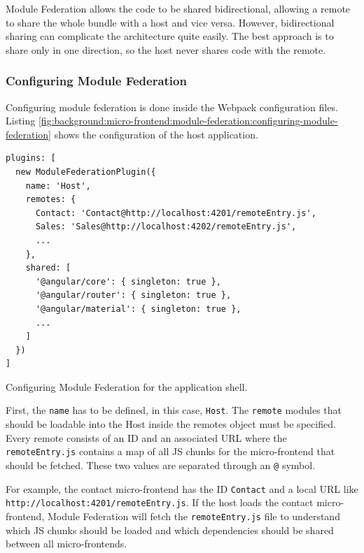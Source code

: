 \noindent Module Federation allows the code to be shared bidirectional, allowing a remote to share the whole bundle with a host and vice versa. However, bidirectional sharing can complicate the architecture quite easily. The best approach is to share only in one direction, so the host never shares code with the remote. \cite[119]{book:2021:mezzalira:applied-methods:building-micro-frontends}

\subsubsection{Configuring Module Federation}\label{subsubsection:background:micro-frontend:module-federation:configuring-module-federation}

Configuring module federation is done inside the Webpack configuration files. Listing \ref{fig:background:micro-frontend:module-federation:configuring-module-federation} shows the configuration of the host application.

\ifshowListings
\begin{listing}[H]
    \begin{verbatim}
plugins: [
  new ModuleFederationPlugin({
    name: 'Host',
    remotes: {
      Contact: 'Contact@http://localhost:4201/remoteEntry.js',
      Sales: 'Sales@http://localhost:4202/remoteEntry.js',
      ...
    },
    shared: [
      '@angular/core': { singleton: true },
      '@angular/router': { singleton: true },
      '@angular/material': { singleton: true },
      ...
    ]
  })
]
    \end{verbatim}
    \caption{Configuring Module Federation for the application shell.}\label{fig:background:micro-frontend:module-federation:configuring-module-federation}
\end{listing}
\fi

\noindent First, the \texttt{name} has to be defined, in this case, \texttt{Host}. The \texttt{remote} modules that should be loadable into the Host inside the remotes object must be specified. Every remote consists of an ID and an associated \ac{URL} where the \texttt{remoteEntry.js} contains a map of all \ac{JS} chunks for the micro-frontend that should be fetched. These two values are separated through an \texttt{@} symbol. \cite[124]{book:2021:mezzalira:applied-methods:building-micro-frontends}

\bigskip

\noindent For example, the contact micro-frontend has the ID \texttt{Contact} and a local \ac{URL} like \texttt{http:\slash \slash localhost:4201\slash remoteEntry.js}. If the host loads the contact micro-frontend, Module Federation will fetch the \texttt{remoteEntry.js} file to understand which \ac{JS} chunks should be loaded and which dependencies should be shared between all micro-frontends. \cite[125]{book:2021:mezzalira:applied-methods:building-micro-frontends}

